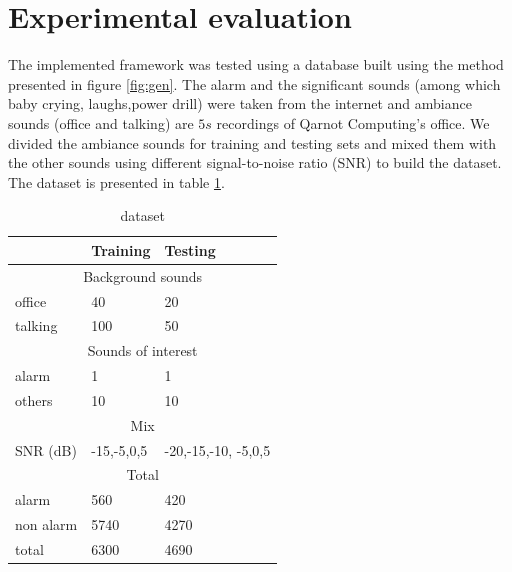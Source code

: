 \documentclass[10pt, conference, compsocconf]{IEEEtran}
\begin{document}
\section{Experimental evaluation} \label{Proof-of-concept}
The implemented framework was tested using a database built using the method presented in figure \ref{fig:gen}. The alarm and the significant sounds (among which baby crying, laughs,power drill) were taken from the internet and ambiance sounds (office and talking) are $5s$ recordings of Qarnot Computing's office. We divided the ambiance sounds for training and testing sets and mixed them with the other sounds using different signal-to-noise ratio (SNR) to build the dataset. The dataset is presented in table \ref{table:dataset}.
\begin{table}[h]
  \centering
  \begin{tabular}{|*{3}{l|}}
    \hline
    & Training & Testing \\
    \hline
    \multicolumn{3}{|c|}{Background sounds} \\
    \hline
    office & 40 & 20\\
    talking & 100 & 50 \\
    \hline
    \multicolumn{3}{|c|}{Sounds of interest} \\
    \hline
    alarm & 1 & 1 \\
    others & 10 & 10 \\
    \hline
    \multicolumn{3}{|c|}{Mix} \\
    \hline
    SNR (dB)& -15,-5,0,5 & -20,-15,-10, -5,0,5 \\
    \hline
    \multicolumn{3}{|c|}{Total} \\ 
    \hline
    alarm & 560 & 420 \\
    non alarm & 5740 & 4270 \\
    total & 6300 & 4690 \\
   \hline
  \end{tabular}
\caption{dataset \label{table:dataset}}
\end{table}
\end{document}

